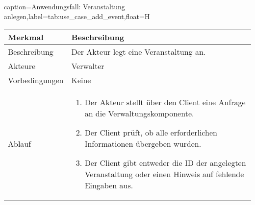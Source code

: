 \begin{dhbwtable}{caption={Anwendungsfall: Veranstaltung anlegen},label=tab:use_case_add_event,float=H}
    \begin{tabularx}{\textwidth}{lX}
        \toprule
        \textbf{Merkmal} & \textbf{Beschreibung}  \\ \midrule
        Beschreibung    & Der Akteur legt eine Veranstaltung an. \\
        Akteure         & Verwalter \\
        Vorbedingungen  & Keine \\
        Ablauf          & \begin{enumerate}
            \item Der Akteur stellt über den Client eine Anfrage an die Verwaltungskomponente.
            \item Der Client prüft, ob alle erforderlichen Informationen übergeben wurden.
            \item Der Client gibt entweder die ID der angelegten Veranstaltung oder einen Hinweis auf fehlende Eingaben aus.
        \end{enumerate} \\\bottomrule
    \end{tabularx}    
\end{dhbwtable}
